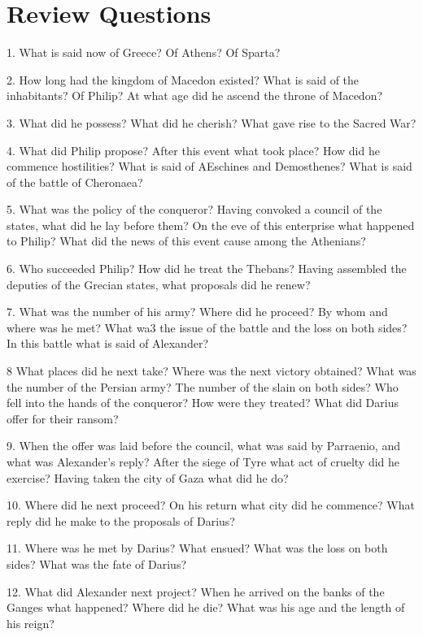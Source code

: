 \documentclass[openany,a4paper]{memoir}
\begin{document}
\section{Review Questions}

1. What is said now of Greece? Of Athens? Of 
Sparta?

2. How long had the kingdom of Macedon existed? What 
is said of the inhabitants? Of Philip? At what age did he ascend the 
throne of Macedon?

3. What did he possess? What did he cherish? 
What gave rise to the Sacred War? 

4. What did Philip propose? After this event what took place? 
How did he commence hostilities? What is said of AEschines and Demosthenes? What is said of the battle of Cheronaea? 

5. What was 
the policy of the conqueror? Having convoked a council of the states, 
what did he lay before them? On the eve of this enterprise what happened to Philip? What did the news of this event cause among the 
Athenians? 

6. Who succeeded Philip? 
How did he treat the Thebans? Having assembled the deputies of 
the Grecian states, what proposals did he renew? 

7. What was the 
number of his army? Where did he proceed? By whom and where 
was he met? What wa3 the issue of the battle and the loss on both 
sides? In this battle what is said of Alexander? 

8 What places did 
he next take? Where was the next victory obtained? What was the 
number of the Persian army? The number of the slain on both sides? 
Who fell into the hands of the conqueror? How were they treated? 
What did Darius offer for their ransom?

9. When the offer was laid 
before the council, what was said by Parraenio, and what was Alexander's reply? After the siege of Tyre what act of cruelty did he exercise? Having taken the city of Gaza what did he do? 

10. Where did 
he next proceed? On his return what city did he commence? What 
reply did he make to the proposals of Darius?

11. Where was he met 
by Darius? 
What ensued? What was the loss on both sides? What was the fate 
of Darius? 

12. What did Alexander next project? When he arrived 
on the banks of the Ganges what happened? Where did he die? 
What was his age and the length of his reign?
\end{document}
